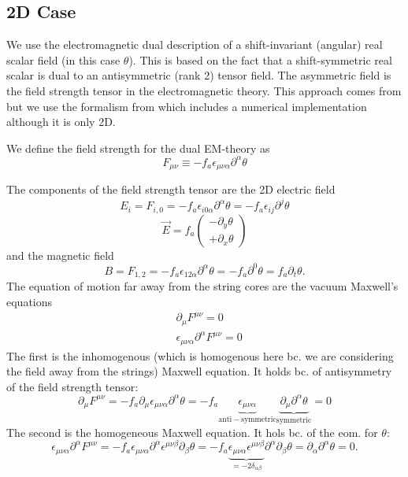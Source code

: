 \documentclass[a4paper]{article}
\begin{document}
\subsection{2D Case}
We use the electromagnetic dual description of a shift-invariant (angular) real scalar field (in this case $\theta$).
This is based on the fact that a shift-symmetric real scalar is dual to an antisymmetric (rank 2) tensor field.
The asymmetric field is the field strength tensor in the electromagnetic theory.
This approach comes from \cite{pinning_down_the_axion_DABHOLKAR1990815} but we use the formalism from \cite{Axion2D_Fleury:2016xrz} which includes a numerical implementation although it is only 2D.

We define the field strength for the dual EM-theory as
\begin{equation}
	F_{\mu \nu} \equiv - f_a \epsilon_{\mu \nu \alpha} \partial^\alpha \theta
\end{equation}

The components of the field strength tensor are the 2D electric field
\begin{equation}
	E_i = F_{i,0} = - f_a \epsilon_{i 0 \alpha} \partial^\alpha \theta = - f_a \epsilon_{i j} \partial^j \theta
\end{equation}
\begin{equation}
	\vec{E} = f_a \begin{pmatrix}
		-\partial_y \theta \\
		+\partial_x \theta
	\end{pmatrix}
\end{equation}
and the magnetic field 
\begin{equation}
	B = F_{1,2} = - f_a \epsilon_{1 2 \alpha} \partial^\alpha \theta = - f_a \partial^0 \theta = f_a \partial_t \theta.
\end{equation}
The equation of motion far away from the string cores are the vacuum Maxwell's equations
\begin{align}
	&\partial_\mu F^{\mu \nu} = 0 \\
	&\epsilon_{\mu \nu \alpha} \partial^\alpha F^{\mu \nu} = 0
\end{align}
The first is the inhomogenous (which is homogenous here bc. we are considering the field away from the strings) Maxwell equation. It holds bc. of antisymmetry of the field strength tensor:
\begin{equation}
	\partial_\mu F^{\mu \nu} =  - f_a \partial_\mu  \epsilon_{\mu \nu \alpha} \partial^\alpha \theta
	=  - f_a  \underbrace{\epsilon_{\mu \nu \alpha}}_{\mathrm{anti-symmetric}} \underbrace{\partial_\mu \partial^\alpha \theta}_{\mathrm{symmetric}} = 0
\end{equation}
The second is the homogeneous Maxwell equation. It hols bc. of the eom. for $\theta$:
\begin{equation}
	\epsilon_{\mu \nu \alpha} \partial^\alpha F^{\mu \nu} = - f_a \epsilon_{\mu \nu \alpha} \partial^\alpha \epsilon^{\mu \nu \beta} \partial_\beta \theta
	= - f_a \underbrace{\epsilon_{\mu \nu \alpha} \epsilon^{\mu \nu \beta}}_{= -2 \delta_{\alpha \beta}} \partial^\alpha \partial_\beta \theta = \partial_\alpha \partial^\alpha \theta = 0.
\end{equation}
\end{document}
